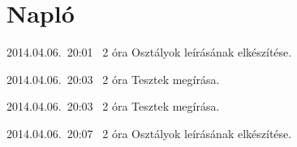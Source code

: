 %
\section{Napló}

\begin{naplo}

\bejegyzes
{2014.04.06.~20:01~} %
{2 óra} %
{\vbator} %
{Osztályok leírásának elkészítése.}

\bejegyzes
{2014.04.06.~20:03~} %
{2 óra} %
{\vantal} %
{Tesztek megírása.}

\bejegyzes
{2014.04.06.~20:03~} %
{2 óra} %
{\vtorok} %
{Tesztek megírása.}

\bejegyzes
{2014.04.06.~20:07~} %
{2 óra} %
{\vadam} %
{Osztályok leírásának elkészítése.}

\end{naplo}

